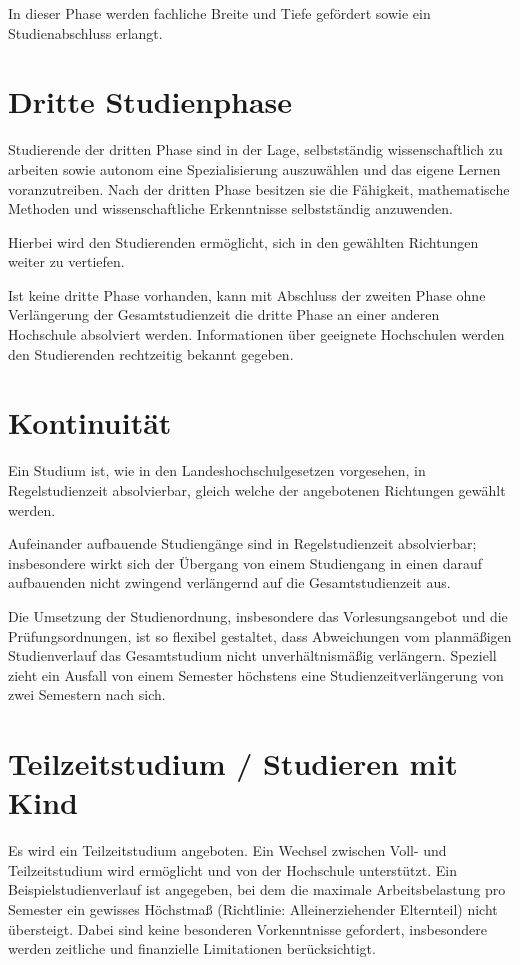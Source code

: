 In dieser Phase werden fachliche Breite und Tiefe gefördert sowie ein Studienabschluss erlangt.

\section{Dritte Studienphase}

Studierende der dritten Phase sind in der Lage, selbstständig wissenschaftlich zu arbeiten sowie autonom eine Spezialisierung auszuwählen und das eigene Lernen voranzutreiben. Nach der dritten Phase besitzen sie die Fähigkeit, mathematische Methoden und wissenschaftliche Erkenntnisse selbstständig anzuwenden.

Hierbei wird den Studierenden ermöglicht, sich in den gewählten Richtungen weiter zu vertiefen.

Ist keine dritte Phase vorhanden, kann mit Abschluss der zweiten Phase ohne Verlängerung der Gesamtstudienzeit die dritte Phase an einer anderen Hochschule
absolviert werden. Informationen über geeignete Hochschulen werden den Studierenden rechtzeitig bekannt gegeben.

\section{Kontinuität}

Ein Studium ist, wie in den Landeshochschulgesetzen vorgesehen, in Regelstudienzeit absolvierbar, gleich welche der angebotenen Richtungen gewählt werden.

Aufeinander aufbauende Studiengänge sind in Regelstudienzeit absolvierbar; insbesondere wirkt sich der Übergang von einem Studiengang in einen darauf aufbauenden nicht zwingend verlängernd auf die Gesamtstudienzeit aus.

Die Umsetzung der Studienordnung, insbesondere das Vorlesungsangebot und die Prüfungsordnungen, ist so flexibel gestaltet, dass Abweichungen vom planmäßigen Studienverlauf das Gesamtstudium nicht unverhältnismäßig verlängern. Speziell zieht ein Ausfall von einem Semester höchstens eine Studienzeitverlängerung von zwei Semestern nach sich.

\section{Teilzeitstudium / Studieren mit Kind}

Es wird ein Teilzeitstudium angeboten. Ein Wechsel zwischen Voll- und Teilzeitstudium wird ermöglicht und von der Hochschule unterstützt. Ein Beispielstudienverlauf ist angegeben, bei dem die maximale Arbeitsbelastung pro Semester ein gewisses Höchstmaß (Richtlinie: Alleinerziehender Elternteil) nicht übersteigt. Dabei sind keine besonderen Vorkenntnisse gefordert, insbesondere werden zeitliche und finanzielle Limitationen berücksichtigt.

